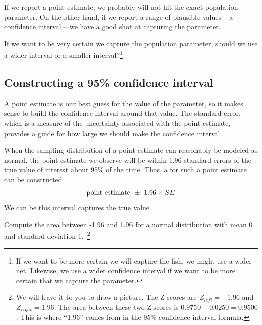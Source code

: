 If we report a point estimate, we probably will not hit the exact population parameter. On the other hand, if we report a range of plausible values -- a confidence interval -- we have a good shot at capturing the parameter.

\begin{exercise}
If we want to be very certain we capture the population parameter, should we use a wider interval or a smaller interval?\footnote{If we want to be more certain we will capture the fish, we might use a wider net. Likewise, we use a wider confidence interval if we want to be more certain that we capture the parameter.}
\end{exercise}


\subsection{Constructing a 95\% confidence interval}

A point estimate is our best guess for the value of the parameter, so it makes sense to build the confidence interval around that value. The standard error, which is a measure of the uncertainty associated with the point estimate, provides a guide for how large we should make the confidence interval.

\begin{termBox}{
When the sampling distribution of a point estimate can reasonably be modeled as normal, the point estimate we observe will be within 1.96 standard errors of the true value of interest about 95\% of the time. Thus, a  for such a point estimate can be constructed:\vspace{-2mm}
\begin{align}
\text{point estimate}\ \pm\ 1.96 \times SE\vspace{-2mm}
\label{95PercentConfidenceIntervalFormula}
\end{align}
We can be  this interval captures the true value.}
\end{termBox}

\begin{exercise}
Compute the area between -1.96 and 1.96 for a normal distribution with mean 0 and standard deviation 1.~\footnote{We will leave it to you to draw a picture. The Z scores are $Z_{left} = -1.96$ and $Z_{right} = 1.96$. The area between these two Z scores is $0.9750 - 0.0250 = 0.9500$. This is where ``1.96'' comes from in the 95\% confidence interval formula.}
\end{exercise}

